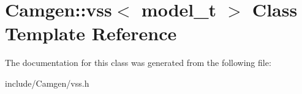 \hypertarget{a00573}{\section{Camgen\-:\-:vss$<$ model\-\_\-t $>$ Class Template Reference}
\label{a00573}
}


The documentation for this class was generated from the following file\-:\begin{DoxyCompactItemize}
\item 
include/\-Camgen/vss.\-h\end{DoxyCompactItemize}
